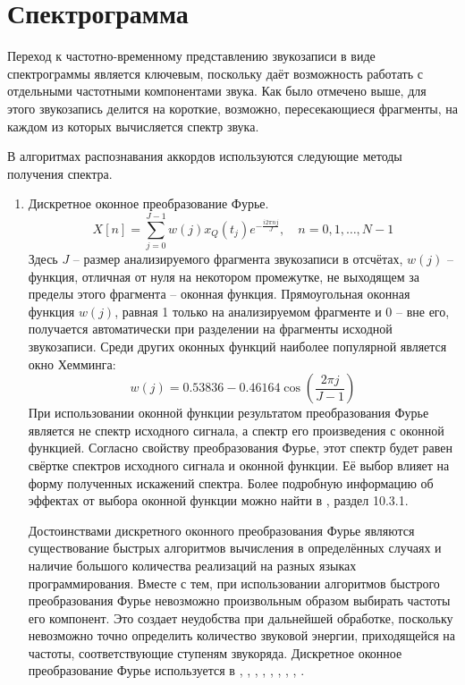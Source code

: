 \section{Спектрограмма} \label{sectL_spect}

Переход к частотно-временному представлению звукозаписи в виде спектрограммы
является ключевым, поскольку даёт возможность работать с отдельными частотными
компонентами звука. Как было отмечено выше, для этого звукозапись делится на
короткие, возможно, пересекающиеся фрагменты, на каждом из которых вычисляется
спектр звука.

В алгоритмах распознавания аккордов используются следующие методы получения
спектра.
\begin{enumerate}
  \item Дискретное оконное преобразование Фурье.
  $$X[n] = \sum_{j=0}^{J-1} w(j)x_Q(t_j) e^{-\frac{i 2\pi nj}{J}}, \quad n=0, 1,
  \ldots, N-1$$
  Здесь $J$ -- размер анализируемого фрагмента звукозаписи в отсчётах, $w(j)$ --
  функция, отличная от нуля на некотором промежутке, не выходящем за пределы
  этого фрагмента -- оконная функция. Прямоугольная оконная функция $w(j)$,
  равная 1 только на анализируемом фрагменте и 0 -- вне его, получается
  автоматически при разделении на фрагменты исходной звукозаписи. Среди других
  оконных функций наиболее популярной является окно Хемминга:
  $$w(j) = 0.53836 - 0.46164 \cos \left( \frac{2\pi j}{J-1} \right)$$
  При использовании оконной функции результатом преобразования Фурье является не
  спектр исходного сигнала, а спектр его произведения с оконной функцией.  
  Согласно свойству преобразования Фурье, этот спектр будет равен свёртке
  спектров исходного сигнала и оконной функции. Её выбор влияет на форму
  полученных искажений спектра. Более подробную информацию об эффектах от выбора
  оконной функции можно найти в \cite{Oppenheim2006}, раздел 10.3.1.
  
  Достоинствами дискретного оконного преобразования Фурье являются существование
  быстрых алгоритмов вычисления в определённых случаях и наличие большого
  количества реализаций на разных языках программирования. Вместе с тем, при
  использовании алгоритмов быстрого преобразования Фурье невозможно произвольным
  образом выбирать частоты его компонент. Это создает неудобства при дальнейшей
  обработке, поскольку невозможно точно определить количество звуковой энергии,
  приходящейся на частоты, соответствующие ступеням звукоряда. Дискретное
  оконное преобразование Фурье используется в \cite{Sheh2003},
  \cite{Gomez2006}, \cite{Burgoyne2007}, \cite{Papadopoulos2007},
  \cite{Khadkevich2009}, \cite{Weller2009}, \cite{Mauch2010},
  \cite{Khadkevich2011}, \cite{DeHaas2012}.
  

\end{enumerate}
